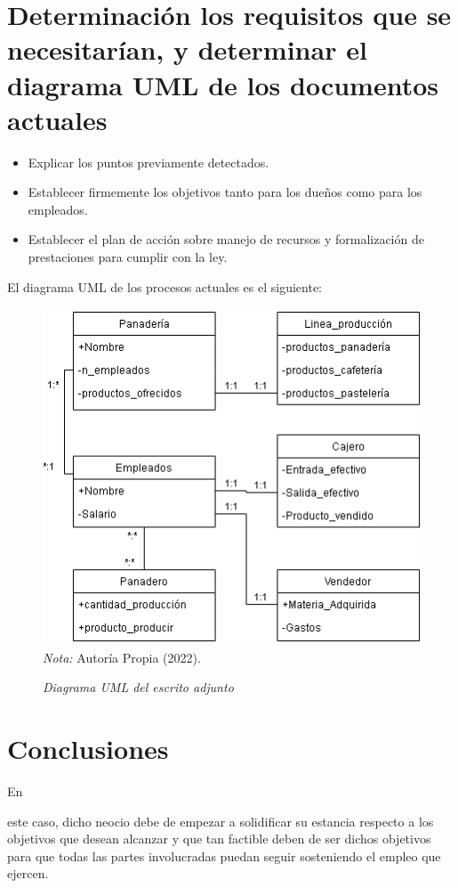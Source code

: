 \documentclass[stu, 12pt, letterpaper, donotrepeattitle, floatsintext, natbib]{apa7}
\begin{document}
\section{Determinación los requisitos que se necesitarían, y determinar el diagrama UML de los documentos actuales}
\begin{justifying}
   \begin{itemize}
    \item Explicar los puntos previamente detectados.
    \item Establecer firmemente los objetivos tanto para los dueños como para los empleados.
    \item Establecer el plan de acción sobre manejo de recursos y formalización de prestaciones para cumplir con la ley.
   \end{itemize}
\end{justifying}
El diagrama UML de los procesos actuales es el siguiente:
\begin{figure}[H]
    \caption{\emph{Diagrama UML del escrito adjunto\\}}
    \centering
    \smallskip
    \includegraphics[width=14cm, height=10cm]{Untitled Diagram.drawio.png}
    \bigskip
    {\justifying\small\textit{\\Nota:} Autoría Propia (2022).}%
\end{figure}
\vspace{\baselineskip}
\section{Conclusiones}
En \begin{justifying}
    este caso, dicho neocio debe de empezar a solidificar su estancia respecto a los objetivos que desean alcanzar y que tan factible deben de ser 
dichos objetivos para que todas las partes involucradas puedan seguir sosteniendo el empleo que ejercen. 
\end{justifying}
\end{document}
